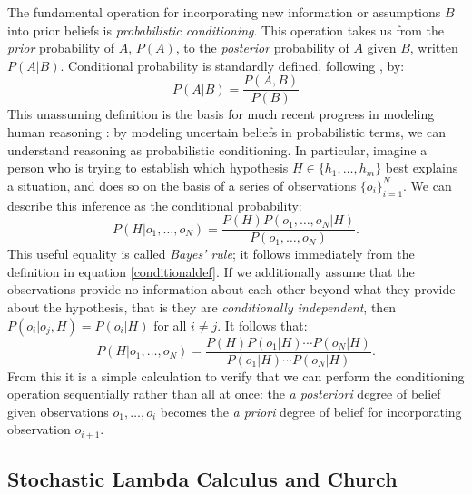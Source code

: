 \documentclass[12pt]{article}
\begin{document}
The fundamental operation for incorporating new information or assumptions $B$ into prior beliefs is \emph{probabilistic conditioning}. 
This operation takes us from the \emph{prior} probability of $A$, $P(A)$, to the \emph{posterior} probability of $A$ given $B$, written $P(A|B)$. 
Conditional probability is standardly defined, following \citet{kolmogorov33}, by:
\begin{equation}
\label{conditionaldef}
P(A|B) = \frac{P(A,B)}{P(B)} 
\end{equation}
This unassuming definition is the basis for much recent progress in modeling human reasoning \cite[e.g.][]{tenenbaum2011}: by modeling uncertain beliefs in probabilistic terms, we can understand reasoning as probabilistic conditioning. 
In particular, imagine a person who is trying to establish which hypothesis $H\in\{h_1,\dots,h_m\}$ best explains a situation, and does so on the basis of a series of observations $\{o_i\}_{i=1}^N$. 
We can describe this inference as the conditional probability:
\begin{equation}
P(H|o_1,\dots,o_N) = \frac{P(H)P(o_1,\dots,o_N|H)}{P(o_1,\dots,o_N)}.
\end{equation}
This useful equality is called \emph{Bayes' rule}; it follows immediately from the definition in equation \ref{conditionaldef}. 
If we additionally assume that the observations provide no information about each other beyond what they provide about the hypothesis, that is they are \emph{conditionally independent}, then $P(o_i|o_j, H)=P(o_i|H)$ for all $i\neq j$. 
It follows that:
\begin{equation}
P(H|o_1,\dots,o_N) = \frac{P(H)P(o_1|H)\cdots P(o_N|H)}{P(o_1|H)\cdots P(o_N|H)}.
\end{equation}
From this it is a simple calculation to verify that we can perform the conditioning operation sequentially rather than all at once: the \emph{a posteriori} degree of belief given observations $o_1,\dots,o_i$ becomes the \emph{a priori} degree of belief for incorporating observation $o_{i+1}$.

\subsection{Stochastic Lambda Calculus and Church}
\end{document}
